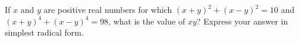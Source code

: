 If $x$ and $y$ are positive real numbers for which $(x+y)^2+(x-y)^2=10$ and $(x+y)^4+(x-y)^4=98$, what is the value of $xy$? Express your answer in simplest radical form.
